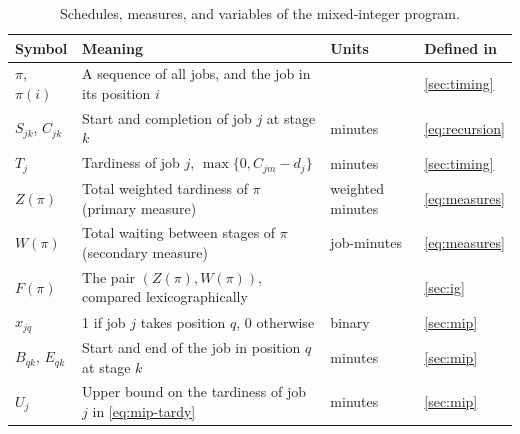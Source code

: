 \begin{table}[!htbp]
\centering
\caption{Schedules, measures, and variables of the mixed-integer program.}
\label{tab:notation-schedule}
\small
\begin{tabularx}{\textwidth}{lLll}
\toprule
Symbol & Meaning & Units & Defined in \\
\midrule
$\pi$, $\pi(i)$ & A sequence of all jobs, and the job in its position $i$ & & \cref{sec:timing} \\
$S_{jk}$, $C_{jk}$ & Start and completion of job $j$ at stage $k$ & minutes & \eqref{eq:recursion} \\
$T_j$ & Tardiness of job $j$, $\max\{0, C_{jm} - d_j\}$ & minutes & \cref{sec:timing} \\
$Z(\pi)$ & Total weighted tardiness of $\pi$ (primary measure) & weighted minutes & \eqref{eq:measures} \\
$W(\pi)$ & Total waiting between stages of $\pi$ (secondary measure) & job-minutes & \eqref{eq:measures} \\
$F(\pi)$ & The pair $(Z(\pi), W(\pi))$, compared lexicographically & & \cref{sec:ig} \\
$x_{jq}$ & 1 if job $j$ takes position $q$, 0 otherwise & binary & \cref{sec:mip} \\
$B_{qk}$, $E_{qk}$ & Start and end of the job in position $q$ at stage $k$ & minutes & \cref{sec:mip} \\
$U_j$ & Upper bound on the tardiness of job $j$ in \eqref{eq:mip-tardy} & minutes & \cref{sec:mip} \\
\bottomrule
\end{tabularx}
\end{table}

